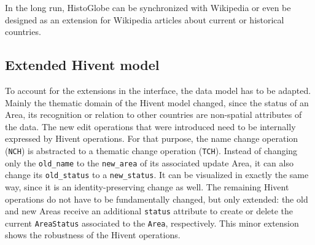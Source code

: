 In the long run, HistoGlobe can be synchronized with Wikipedia or even be designed as an extension for Wikipedia articles about current or historical countries.







\subsection{Extended Hivent model} %
\label{sub:extended_hivent_model}

To account for the extensions in the interface, the data model has to be adapted. Mainly the thematic domain of the Hivent model changed, since the status of an Area, its recognition or relation to other countries are non-spatial attributes of the data. The new edit operations that were introduced need to be internally expressed by Hivent operations. For that purpose, the name change operation (\texttt{NCH}) is abstracted to a thematic change operation (\texttt{TCH}). Instead of changing only the \texttt{old\_name} to the \texttt{new\_area} of its associated update Area, it can also change its \texttt{old\_status} to a \texttt{new\_status}. It can be visualized in exactly the same way, since it is an identity-preserving change as well. The remaining Hivent operations do not have to be fundamentally changed, but only extended: the old and new Areas receive an additional \texttt{status} attribute to create or delete the current \texttt{AreaStatus} associated to the \texttt{Area}, respectively. This minor extension shows the robustness of the Hivent operations.

